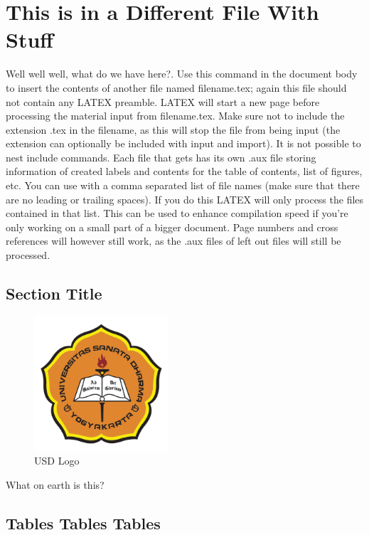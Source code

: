 \chapter{This is in a Different File With Stuff}
Well well well, what do we have here?. Use this command in the document body to insert the contents of another file named filename.tex; again this file should not contain any LATEX preamble. LATEX will start a new page before processing the material input from filename.tex. Make sure not to include the extension .tex in the filename, as this will stop the file from being input (the extension can optionally be included with input and import). It is not possible to nest include commands. Each file that gets has its own .aux file storing information of created labels and contents for the table of contents, list of figures, etc. You can use  with a comma separated list of file names (make sure that there are no leading or trailing spaces). If you do this LATEX will only process the files contained in that list. This can be used to enhance compilation speed if you're only working on a small part of a bigger document. Page numbers and cross references will however still work, as the .aux files of left out files will still be processed.
\section{Section Title}

\begin{figure}[H] %

	\centering
	\includegraphics[width=5cm]{usd}
	\caption{USD Logo}
\end{figure}

What on earth is this?


\section{Tables Tables Tables}

